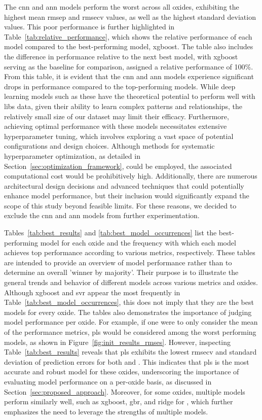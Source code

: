 The \gls{cnn} and \gls{ann} models perform the worst across all oxides, exhibiting the highest mean \gls{rmsep} and \gls{rmsecv} values, as well as the highest standard deviation values.
This poor performance is further highlighted in Table~\ref{tab:relative_performance}, which shows the relative performance of each model compared to the best-performing model, \gls{xgboost}.
The table also includes the difference in performance relative to the next best model, with \gls{xgboost} serving as the baseline for comparison, assigned a relative performance of 100\%.
From this table, it is evident that the \gls{cnn} and \gls{ann} models experience significant drops in performance compared to the top-performing models.
While deep learning models such as these have the theoretical potential to perform well with \gls{libs} data, given their ability to learn complex patterns and relationships, the relatively small size of our dataset may limit their efficacy.
Furthermore, achieving optimal performance with these models necessitates extensive hyperparameter tuning, which involves exploring a vast space of potential configurations and design choices.
Although methods for systematic hyperparameter optimization, as detailed in Section~\ref{sec:optimization_framework}, could be employed, the associated computational cost would be prohibitively high.
Additionally, there are numerous architectural design decisions and advanced techniques that could potentially enhance model performance, but their inclusion would significantly expand the scope of this study beyond feasible limits.
For these reasons, we decided to exclude the \gls{cnn} and \gls{ann} models from further experimentation.

Tables~\ref{tab:best_results} and \ref{tab:best_model_occurrences} list the best-performing model for each oxide and the frequency with which each model achieves top performance according to various metrics, respectively.
These tables are intended to provide an overview of model performance rather than to determine an overall 'winner by majority'.
Their purpose is to illustrate the general trends and behavior of different models across various metrics and oxides.
Although \gls{xgboost} and \gls{svr} appear the most frequently in Table~\ref{tab:best_model_occurrences}, this does not imply that they are the best models for every oxide.
The tables also demonstrates the importance of judging model performance per oxide.
For example, if one were to only consider the mean of the performance metrics, \gls{pls} would be considered among the worst performing models, as shown in Figure~\ref{fig:init_results_rmses}.
However, inspecting Table~\ref{tab:best_results} reveals that \gls{pls} exhibits the lowest \gls{rmsecv} and standard deviation of prediction errors for both  and .
This indicates that \gls{pls} is the most accurate and robust model for these oxides, underscoring the importance of evaluating model performance on a per-oxide basis, as discussed in Section~\ref{sec:proposed_approach}.
Moreover, for some oxides, multiple models perform similarly well, such as \gls{xgboost}, \gls{gbr}, and ridge for , which further emphasizes the need to leverage the strengths of multiple models.

